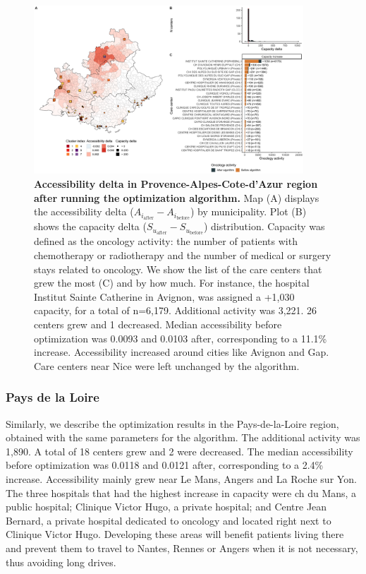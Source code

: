 \begin{figure}[h!]
    \includegraphics[width=0.9\textwidth]{images/camion/fig5_Provence-Alpes-Cote-d'Azur.png}
    \centering
    \caption{ \textbf{Accessibility delta in Provence-Alpes-Cote-d'Azur region
        after running the optimization algorithm.} Map (A) displays the
    accessibility delta ($A_{i_\text{after}} - A_{i_\text{before}}$) by
    municipality. Plot (B) shows the capacity delta
    ($S_{u_\text{after}}-S_{u_\text{before}}$) distribution. Capacity was
    defined as the oncology activity: the number of patients with
    chemotherapy or radiotherapy and the number of medical or surgery stays
    related to oncology. We show the list of the care centers that grew the
    most (C)  and by how much. For instance, the hospital Institut Sainte
    Catherine in Avignon, was assigned a +1,030 capacity, for a total of
    n=6,179. Additional activity was 3,221. 26 centers grew and 1 decreased.
    Median accessibility before optimization was 0.0093 and 0.0103 after,
    corresponding to a 11.1\% increase.  Accessibility increased around
    cities like Avignon and Gap. Care centers near Nice were left unchanged
    by the algorithm. }
    \label{fig:optim-paca}
\end{figure}

\subsubsection{Pays de la Loire}

Similarly, we describe the optimization results in the Pays-de-la-Loire region,
obtained with the same parameters for the algorithm. The additional activity was
1,890. A total of 18 centers grew and 2 were decreased. The median accessibility
before optimization was 0.0118 and 0.0121 after, corresponding to a 2.4\%
increase. Accessibility mainly grew near Le Mans, Angers and La Roche sur Yon.
The three hospitals that had the highest increase in capacity were \ac{ch}
du Mans, a public hospital; Clinique Victor Hugo, a private hospital; and
Centre Jean Bernard, a private hospital dedicated to oncology and located
right next to Clinique Victor Hugo. Developing these areas will benefit patients
living there and prevent them to travel to Nantes, Rennes or Angers when it is
not necessary, thus avoiding long drives.

